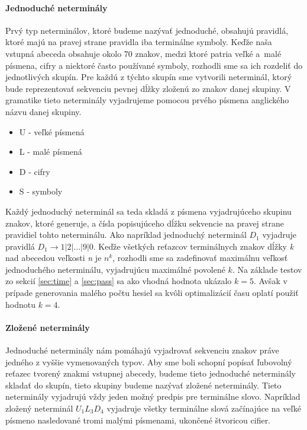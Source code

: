 \paragraph{Jednoduché neterminály}
Prvý typ neterminálov, ktoré budeme nazývať jednoduché, obsahujú pravidlá, ktoré majú na pravej strane pravidla iba terminálne symboly. Keďže naša vstupná abeceda obsahuje okolo 70 znakov, medzi ktoré patria veľké a~malé písmena, cifry a niektoré často používané symboly, rozhodli sme sa ich rozdeliť do jednotlivých skupín. Pre každú z týchto skupín sme vytvorili neterminál, ktorý bude reprezentovať sekvenciu pevnej dĺžky zloženú zo znakov danej skupiny. V gramatike tieto neterminály vyjadrujeme pomocou prvého písmena anglického názvu danej skupiny.
\begin{itemize}
	\item U - veľké písmená
	\item L - malé písmená
	\item D - cifry
	\item S - symboly
\end{itemize}
Každý jednoduchý neterminál sa teda skladá z písmena vyjadrujúceho skupinu znakov, ktoré generuje, a čísla popisujúceho dĺžku sekvencie na pravej strane pravidiel tohto neterminálu. Ako napríklad jednoduchý neterminál \(D_1\) vyjadruje pravidlá \(D_1 \to 1 | 2 | ... | 9 | 0 \). Keďže všetkých reťazcov terminálnych znakov dĺžky \emph{k} nad abecedou veľkosti \emph{n} je \( n^k\), rozhodli sme sa zadefinovať maximálnu veľkosť jednoduchého neterminálu, vyjadrujúcu maximálné povolené \(k\). Na základe testov zo sekcií \ref{sec:time} a \ref{sec:pass} sa ako vhodná hodnota ukázalo \(k = 5\). Avšak v prípade generovania malého počtu hesiel sa kvôli optimalizácií času oplatí použiť hodnotu \(k = 4\).

\paragraph{Zložené neterminály}
Jednoduché neterminály nám pomáhajú vyjadrovať sekvenciu znakov práve jedného z vyššie vymenovaných typov. Aby sme boli schopní popísať ľubovolný reťazec tvorený znakmi vstupnej abecedy, budeme tieto jednoduché neterminály skladať do skupín, tieto skupiny budeme nazývať zložené neterminály. Tieto neterminály vyjadrujú vždy jeden možný predpis pre terminálne slovo. Napríklad zložený neterminál \(U_1L_3D_4\) vyjadruje všetky terminálne slová začínajúce na veľké písmeno nasledované tromi malými písmenami, ukončené štvoricou cifier.

